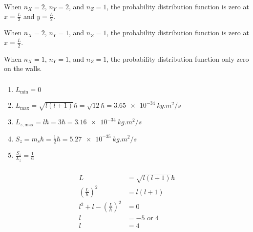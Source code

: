 \documentclass{article}
\begin{document}
\setcounter{subsubsection}{4}
\subsubsection{}

When $n_X = 2$, $n_Y = 2$, and $n_Z = 1$, the probability distribution function is zero at $x = \frac{L}{2}$ and $y = \frac{L}{2}$.

When $n_X = 2$, $n_Y = 1$, and $n_Z = 1$, the probability distribution function is zero at $x = \frac{L}{2}$.

When $n_X = 1$, $n_Y = 1$, and $n_Z = 1$, the probability distribution function only zero on the walls.

\setcounter{subsubsection}{6}
\subsubsection{}

\begin{enumerate}
  \item $L_\text{min} = 0$

  \item $L_\text{max} = \sqrt{l (l + 1)} \hbar = \sqrt{12} \hbar = \qty{3.65e-34}{kg.m^2/s}$

  \item $L_{z,\text{max}} = l \hbar = 3 \hbar = \qty{3.16e-34}{kg.m^2/s}$

  \item $S_z = m_s \hbar = \frac{1}{2} \hbar = \qty{5.27e-35}{kg.m^2/s}$

  \item $\frac{S_z}{L_z} = \frac{1}{6}$
\end{enumerate}

\setcounter{subsubsection}{8}
\subsubsection{}

\begin{align*}
  L                                          & = \sqrt{l (l + 1)} \hbar \\
  \left( \frac{L}{\hbar} \right)^2           & = l (l + 1)              \\
  l^2 + l - \left( \frac{L}{\hbar} \right)^2 & = 0                      \\
  l                                          & = -5 \text{ or } 4       \\
  l                                          & = 4
\end{align*}
\end{document}
